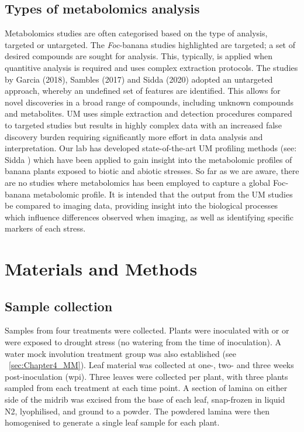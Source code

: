 \subsection{Types of metabolomics analysis}
Metabolomics studies are often categorised based on the type of analysis, targeted or untargeted. The \textit{Foc}-banana studies highlighted are targeted; a set of desired compounds are sought for analysis. This, typically, is applied when quantitive analysis is required and uses complex extraction protocols. The studies by Garcia \et (2018), Sambles \et  (2017) and Sidda \et (2020) adopted an untargeted approach, whereby an undefined set of features are identified. This allows for novel discoveries in a broad range of compounds, including unknown compounds and metabolites. UM uses simple extraction and detection procedures compared to targeted studies but results in highly complex data with an increased false discovery burden requiring significantly more effort in data analysis and interpretation. Our lab has developed state-of-the-art UM profiling methods (see: Sidda ) which have been applied to gain insight into the metabolomic profiles of banana plants exposed to biotic and abiotic stresses.
So far as we are aware, there are no studies where metabolomics has been employed to capture a global Foc-banana metabolomic profile. It is intended that the output from the UM studies be compared to imaging data, providing insight into the biological processes which influence differences observed when imaging, as well as identifying specific markers of each stress.


\section{Materials and Methods}

\subsection{Sample collection}
Samples from four treatments were collected. Plants were inoculated with \Foc or \Xvm or were exposed to drought stress (no watering from the time of inoculation). A water mock involution treatment group was also established (see ~\ref{sec:Chapter4_MM}). 
Leaf material was collected at one-, two- and three weeks post-inoculation (wpi). Three leaves were collected per plant, with three plants sampled from each treatment at each time point. A section of lamina on either side of the midrib was excised from the base of each leaf, snap-frozen in liquid N2, lyophilised, and ground to a powder. The powdered lamina were then homogenised to generate a single leaf sample for each plant. 

